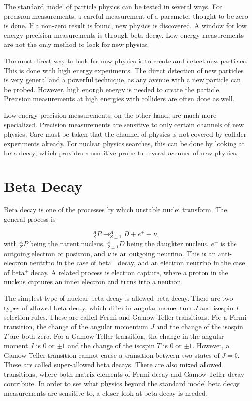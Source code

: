 \documentclass[../MaxHughesThesis.tex]{subfiles}
\begin{document}
The standard model of particle physics can be tested in several ways.
For precision measurements, a careful measurement of a parameter thought to be zero is done.
If a non-zero result is found, new physics is discovered.
A window for low energy precision measurements is through beta decay.
Low-energy measurements are not the only method to look for new physics.

The most direct way to look for new physics is to create and detect new particles.
This is done with high energy experiments. 
The direct detection of new particles is very general and a powerful technique, as any avenue with a new particle can be probed.
However, high enough energy is needed to create the particle.
Precision measurements at high energies with colliders are often done as well. 
 
Low energy precision measurements, on the other hand, are much more specialized.
Precision measurements are sensitive to only certain channels of new physics.
Care must be taken that the channel of physics is not covered by collider experiments already.
For nuclear physics searches, this can be done by looking at beta decay, which provides a sensitive probe to several avenues of new physics.

\section{Beta Decay}
Beta decay is one of the processes by which unstable nuclei transform. 
The general process is %

\begin{equation}
	\label{eq:betadecay}
	^{A}_{Z}P \rightarrow ^{A}_{Z\pm 1}D + e^{\mp} + \nu_{e}
\end{equation}
with $^{A}_{Z}P$ being the parent nucleus, $^{A}_{Z \pm 1}D$ being the daughter nucleus, $e^{\mp}$ is the outgoing electron or positron, and $\nu$ is an outgoing neutrino.
This is an anti-electron neutrino in the case of beta$^{-}$ decay, and an electron neutrino in the case of beta$^{+}$ decay. 
A related process is electron capture, where a proton in the nucleus captures an inner electron and turns into a neutron.

The simplest type of nuclear beta decay is allowed beta decay.
There are two types of allowed beta decay, which differ in angular momentum $J$ and isospin $T$ selection rules.
These are called Fermi and Gamow-Teller transitions. 
For a Fermi transition, the change of the angular momentum $J$ and the change of the isospin $T$ are both zero.
For a Gamow-Teller transition, the change in the angular moment $J$ is $0$ or $\pm1$ and the change of the isospin $T$ is $0$ or $\pm 1$.
However, a Gamow-Teller transition cannot cause a transition between two states of $J = 0$. 
These are called super-allowed beta decays.
There are also mixed allowed transitions, where both matrix elements of Fermi decay and Gamow Teller decay contribute.
In order to see what physics beyond the standard model beta decay measurements are sensitive to, a closer look at beta decay is needed.
\end{document}
